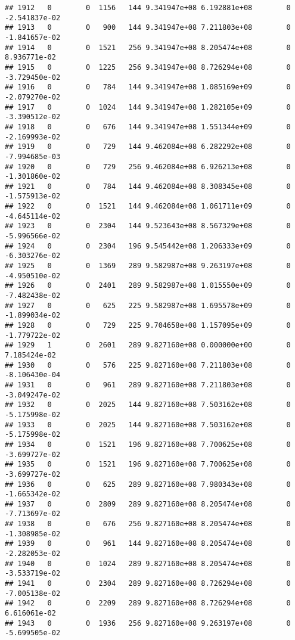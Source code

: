 \documentclass[
]{article}
\begin{document}
\begin{enumerate}
\begin{verbatim}
## 1912   0        0  1156   144 9.341947e+08 6.192881e+08        0 -2.541837e-02
## 1913   0        0   900   144 9.341947e+08 7.211803e+08        0 -1.841657e-02
## 1914   0        0  1521   256 9.341947e+08 8.205474e+08        0  8.936771e-02
## 1915   0        0  1225   256 9.341947e+08 8.726294e+08        0 -3.729450e-02
## 1916   0        0   784   144 9.341947e+08 1.085169e+09        0 -2.079270e-02
## 1917   0        0  1024   144 9.341947e+08 1.282105e+09        0 -3.390512e-02
## 1918   0        0   676   144 9.341947e+08 1.551344e+09        0 -2.169993e-02
## 1919   0        0   729   144 9.462084e+08 6.282292e+08        0 -7.994685e-03
## 1920   0        0   729   256 9.462084e+08 6.926213e+08        0 -1.301860e-02
## 1921   0        0   784   144 9.462084e+08 8.308345e+08        0 -1.575913e-02
## 1922   0        0  1521   144 9.462084e+08 1.061711e+09        0 -4.645114e-02
## 1923   0        0  2304   144 9.523643e+08 8.567329e+08        0 -5.996566e-02
## 1924   0        0  2304   196 9.545442e+08 1.206333e+09        0 -6.303276e-02
## 1925   0        0  1369   289 9.582987e+08 9.263197e+08        0 -4.950510e-02
## 1926   0        0  2401   289 9.582987e+08 1.015550e+09        0 -7.482438e-02
## 1927   0        0   625   225 9.582987e+08 1.695578e+09        0 -1.899034e-02
## 1928   0        0   729   225 9.704658e+08 1.157095e+09        0 -1.779722e-02
## 1929   1        0  2601   289 9.827160e+08 0.000000e+00        0  7.185424e-02
## 1930   0        0   576   225 9.827160e+08 7.211803e+08        0 -8.106430e-04
## 1931   0        0   961   289 9.827160e+08 7.211803e+08        0 -3.049247e-02
## 1932   0        0  2025   144 9.827160e+08 7.503162e+08        0 -5.175998e-02
## 1933   0        0  2025   144 9.827160e+08 7.503162e+08        0 -5.175998e-02
## 1934   0        0  1521   196 9.827160e+08 7.700625e+08        0 -3.699727e-02
## 1935   0        0  1521   196 9.827160e+08 7.700625e+08        0 -3.699727e-02
## 1936   0        0   625   289 9.827160e+08 7.980343e+08        0 -1.665342e-02
## 1937   0        0  2809   289 9.827160e+08 8.205474e+08        0 -7.713697e-02
## 1938   0        0   676   256 9.827160e+08 8.205474e+08        0 -1.308985e-02
## 1939   0        0   961   144 9.827160e+08 8.205474e+08        0 -2.282053e-02
## 1940   0        0  1024   289 9.827160e+08 8.205474e+08        0 -3.533719e-02
## 1941   0        0  2304   289 9.827160e+08 8.726294e+08        0 -7.005138e-02
## 1942   0        0  2209   289 9.827160e+08 8.726294e+08        0  6.616061e-02
## 1943   0        0  1936   256 9.827160e+08 9.263197e+08        0 -5.699505e-02

\end{verbatim}
\end{enumerate}
\end{document}
